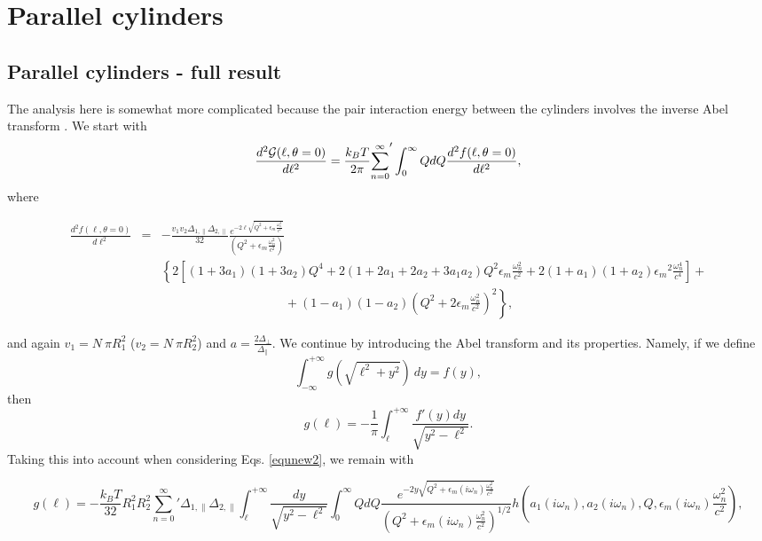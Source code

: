 \documentclass[onecolumn,letterpaper,amsmath,amssymb,floatfix,aps,superscriptaddress]{revtex4}
\begin{document}
\section{Parallel cylinders}

\subsection{Parallel cylinders - full result}

The analysis here is somewhat more complicated because the pair interaction energy between the cylinders involves the inverse Abel transform \cite{Abel}. We start with
\begin{equation}
\frac{d^{2}{\cal G}(\ell,\theta = 0)}{d\ell^{2}} = \frac{k_BT}{2\pi} {\sum_{n=0}^{\infty}}' \int_0^{\infty} Q dQ \frac{d^{2}f(\ell,\theta = 0)}{d\ell^{2}},
\label{equnew1}
\end{equation}
where  
\begin{widetext}
\begin{eqnarray}
\frac{d^{2}f(\ell,\theta = 0)}{d\ell^{2}} &=& - \frac{v_1 v_2 \Delta_{1,\parallel} \Delta_{2,\parallel}}{32} 
\frac{e^{-2 \ell \sqrt{Q^{2} + \epsilon_m \frac{\omega_n^{2}}{c^{2}}}}}{(Q^{2} + \epsilon_m \frac{\omega_n^{2}}{c^{2}})} \nonumber \\
& & \left \{ 2 \left [ (1+3a_1)(1+3a_2) Q^{4} + 2 (1+2a_1+2a_2+3a_1a_2) Q^{2} \epsilon_m \frac{\omega_n^{2}}{c^{2}} + 2(1+a_1)(1+a_2) 
{\epsilon_m}^{2} \frac{\omega_n^{4}}{c^{4}}\right] \right. + \nonumber\\
& &~~~~~~~~~~~~~~~~~~~~~~~~~~~~~~~~~~~~~~~~~~~~~ +  \left. (1-a_1)(1-a_2)(Q^{2} + 2 \epsilon_m \frac{\omega_n^{2}}{c^{2}})^2 \right \},
\label{equnew2}
\end{eqnarray}
\end{widetext}
and again $v_1 = N~\pi R_1^{2}$ ($v_2 = N~\pi R_2^{2}$) and $a = \frac{2 \Delta_{\perp}}{\Delta_{\parallel}}$. We continue by introducing the Abel transform and its properties. Namely, if we define
\begin{equation}
\int_{-\infty}^{+\infty}g(\sqrt{\ell^{2}+y^{2}})~dy = f(y),
\end{equation} 
then
\begin{equation}
g(\ell) = - \frac{1}{\pi} \int_{\ell}^{+\infty} \frac{f'(y) dy}{\sqrt{y^2 - \ell^2}}.
\end{equation} 
Taking this into account when considering Eqs. \ref{equnew2}, we remain with 
\begin{widetext}
\begin{equation}
g(\ell) = - \frac{k_BT}{32} {R_1^{2} R_2^{2}} 
{\sum_{n=0}^{\infty}}' \Delta_{1,\parallel} \Delta_{2,\parallel} \int_{\ell}^{+\infty}\!\!\!\!\! \frac{dy}{\sqrt{y^2 - \ell^2}} \int_0^{\infty}\!\!\!  
Q dQ \frac{e^{-2 y \sqrt{Q^{2} + \epsilon_m(i \omega_n) \frac{\omega_n^{2}}{c^{2}}}}}{(Q^{2} + \epsilon_m(i \omega_n) \frac{\omega_n^{2}}{c^{2}})^{1/2}} 
h(a_1(i \omega_n), a_2(i \omega_n), Q, \epsilon_m(i \omega_n) \frac{\omega_n^{2}}{c^{2}}),
\end{equation} 
\end{widetext}
\end{document}
